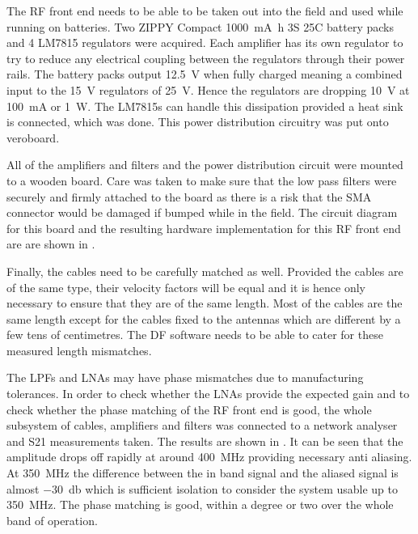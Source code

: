 The RF front end needs to be able to be taken out into the field and used while running on batteries.
Two ZIPPY Compact \SI{1000}{\milli\ampere\hour} 3S 25C battery packs and 4 LM7815 regulators were acquired. 
Each amplifier has its own regulator to try to reduce any electrical coupling between the regulators through their power rails.
The battery packs output \SI{12.5}{\volt} when fully charged meaning a combined input to the \SI{15}{\volt} regulators of \SI{25}{\volt}. Hence the regulators are dropping \SI{10}{\volt} at \SI{100}{\milli\ampere} or \SI{1}{\watt}.
The LM7815s can handle this dissipation provided a heat sink is connected, which was done.
This power distribution circuitry was put onto veroboard.

All of the amplifiers and filters and the power distribution circuit were mounted to a wooden board.
Care was taken to make sure that the low pass filters were securely and firmly attached to the board as there is a risk that the SMA connector would be damaged if bumped while in the field.
The circuit diagram for this board and the resulting hardware implementation for this RF front end are are shown in .

Finally, the cables need to be carefully matched as well. Provided the cables are of the same type, their velocity factors will be equal and it is hence only necessary to ensure that they are of the same length. Most of the cables are the same length except for the cables fixed to the antennas which are different by a few tens of centimetres. The DF software needs to be able to cater for these measured length mismatches. 

The LPFs and LNAs may have phase mismatches due to manufacturing tolerances. In order to check whether the LNAs provide the expected gain and to check whether the phase matching of the RF front end is good, the whole subsystem of cables, amplifiers and filters was connected to a network analyser and S21 measurements taken. The results are shown in . It can be seen that the amplitude drops off rapidly at around \SI{400}{\mega\hertz} providing necessary anti aliasing. At \SI{350}{\mega\hertz} the difference between the in band signal and the aliased signal is almost \SI{-30}{\decibel} which is sufficient isolation to consider the system usable up to \SI{350}{\mega\hertz}. The phase matching is good, within a degree or two over the whole band of operation.

